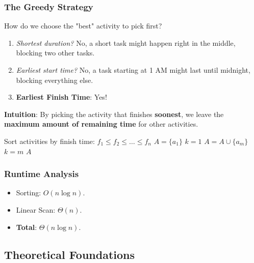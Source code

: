 \documentclass[12pt]{article}
\theoremstyle{blueplain}
\theoremstyle{bluedef}
\theoremstyle{blueremark}
\begin{document}
\subsubsection{The Greedy Strategy}
How do we choose the "best" activity to pick first?
\begin{enumerate}
    \item \textit{Shortest duration?} No, a short task might happen right in the middle, blocking two other tasks.
    \item \textit{Earliest start time?} No, a task starting at 1 AM might last until midnight, blocking everything else.
    \item \textbf{Earliest Finish Time}: Yes!
\end{enumerate}

\textbf{Intuition}: By picking the activity that finishes \textbf{soonest}, we leave the \textbf{maximum amount of remaining time} for other activities.

\begin{algorithm}
    \caption{Greedy-Activity-Selector(s, f)}\label{alg:activity}
    \begin{algorithmic}[1]
        \State Sort activities by finish time: $f_1 \le f_2 \le \dots \le f_n$
        \State $A = \{a_1\}$ 
        \State $k = 1$ 
         
        \State $A = A \cup \{a_m\}$
        \State $k = m$
        \EndIf
        \EndFor
        \Return $A$
        \EndProcedure
    \end{algorithmic}
\end{algorithm}

\subsubsection{Runtime Analysis}
\begin{itemize}
    \item Sorting: $O(n \log n)$.
    \item Linear Scan: $\Theta(n)$.
    \item \textbf{Total}: $\Theta(n \log n)$.
\end{itemize}

\subsection{Theoretical Foundations}
\end{document}
